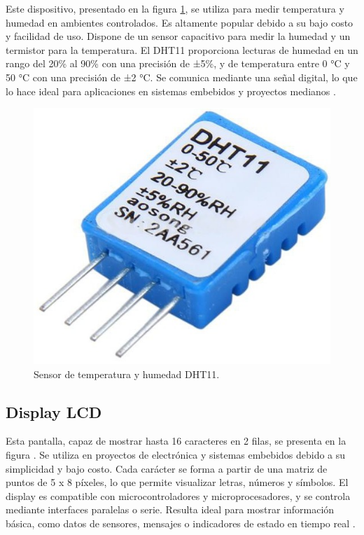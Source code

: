 Este dispositivo, presentado en la figura \ref{fig:Dht11}, se utiliza para medir temperatura y humedad en ambientes controlados. Es altamente popular debido a su bajo costo y facilidad de uso. Dispone de un sensor capacitivo para medir la humedad y un termistor para la temperatura. El DHT11 proporciona lecturas de humedad en un rango del 20\% al 90\% con una precisión de ±5\%, y de temperatura entre 0 °C y 50 °C con una precisión de ±2 °C. Se comunica mediante una señal digital, lo que lo hace ideal para aplicaciones en sistemas embebidos y proyectos medianos \citep{WEBSITE:Dht112024}.

\begin{figure}[htbp]
	\centering
	\includegraphics[width=.5\textwidth]{./Figures/dht11.png}
	\caption{Sensor de temperatura y humedad DHT11\protect\footnotemark.}
	\label{fig:Dht11}
\end{figure}


\newpage

\subsection{Display LCD}
\label{subsec:DisplayLCD}

Esta pantalla, capaz de mostrar hasta 16 caracteres en 2 filas, se presenta en la figura \citep{WEBSITE:lcd2024}. Se utiliza en proyectos de electrónica y sistemas embebidos debido a su simplicidad y bajo costo. Cada carácter se forma a partir de una matriz de puntos de 5 x 8 píxeles, lo que permite visualizar letras, números y símbolos. El display es compatible con microcontroladores y microprocesadores, y se controla mediante interfaces paralelas o serie. Resulta ideal para mostrar información básica, como datos de sensores, mensajes o indicadores de estado en tiempo real \citep{WEBSITE:lcd2024}.

